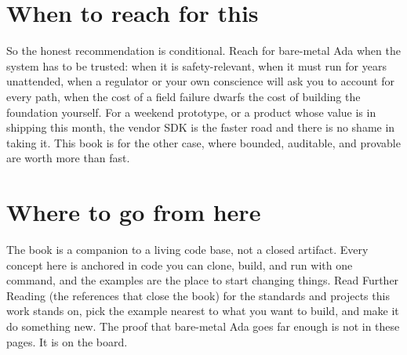 \section*{When to reach for this}

So the honest recommendation is conditional. Reach for bare-metal Ada when the system
has to be trusted: when it is safety-relevant, when it must run for years unattended,
when a regulator or your own conscience will ask you to account for every path, when
the cost of a field failure dwarfs the cost of building the foundation yourself. For
a weekend prototype, or a product whose value is in shipping this month, the vendor
SDK is the faster road and there is no shame in taking it. This book is for the other
case, where bounded, auditable, and provable are worth more than fast.

\section*{Where to go from here}

The book is a companion to a living code base, not a closed artifact. Every concept here is anchored in code you can clone, build, and run with
one command, and the examples are the place to start changing things. Read Further
Reading (the references that close the book) for the standards and projects this work
stands on, pick the example nearest to what you want to build, and make it do
something new. The proof that bare-metal Ada goes far enough is not in these pages. It
is on the board.
